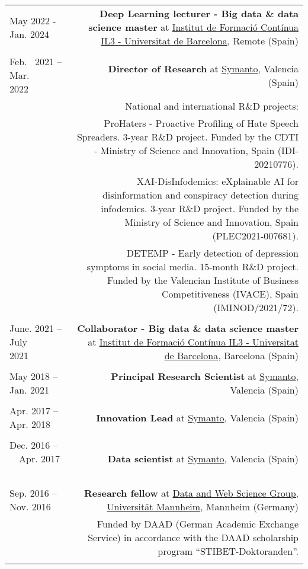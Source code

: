 \documentclass[10pt]{article}
\begin{document}
\begin{tabular}{L!{\VRule}R}
May 2022 - Jan. 2024~~~ &{\textbf{Deep Learning lecturer - Big data \& data science master} at  \href{https://www.il3.ub.edu/}{Institut de Formació Contínua IL3 - Universitat de Barcelona}, Remote (Spain)}\\
&\\

Feb.~ 2021 -- Mar. 2022~~~~ &{\textbf{Director of Research} at \href{https://www.symanto.com/}{Symanto}, Valencia (Spain)}\\
&\scriptsize{National and international R\&D projects:}\\
&\scriptsize{\textcolor{white}{ssss}ProHaters - Proactive Profiling of Hate Speech Spreaders. 3-year R\&D project. Funded by the CDTI - Ministry of Science and Innovation, Spain (IDI-20210776).}\\
&\scriptsize{\textcolor{white}{ssss}XAI-DisInfodemics: eXplainable AI for disinformation and conspiracy detection during infodemics. 3-year R\&D project. Funded by the Ministry of Science and Innovation, Spain (PLEC2021-007681).}\\
&\scriptsize{\textcolor{white}{ssss}DETEMP - Early detection of depression symptoms in social media. 15-month R\&D project. Funded by the Valencian Institute of Business Competitiveness (IVACE), Spain (IMINOD/2021/72)}. \\&\\

June. 2021 -- July 2021~~~~~ &{\textbf{Collaborator - Big data \& data science master} at  \href{https://www.il3.ub.edu/}{Institut de Formació Contínua IL3 - Universitat de Barcelona}, Barcelona (Spain)}\\
&\\
May 2018 -- Jan. 2021~~~ &{\textbf{Principal Research Scientist} at \href{https://www.symanto.com/}{Symanto}, Valencia (Spain)}\\&\\
Apr. 2017 -- Apr. 2018~~~ &{\textbf{Innovation Lead} at \href{https://www.symanto.com/}{Symanto}, Valencia (Spain)}\\&\\
Dec. 2016 -- ~~Apr. 2017 ~~&{\textbf{Data scientist} at \href{https://www.symanto.com/}{Symanto}, Valencia (Spain)}\\&\\
Sep. 2016 -- Nov. 2016 ~~&{\textbf{Research fellow} at \href{http://dws.informatik.uni-mannheim.de/en/home/}{Data and Web Science Group, Universit{\"a}t Mannheim}, Mannheim (Germany)}\\
&\scriptsize{Funded by DAAD (German Academic Exchange Service) in accordance with the DAAD scholarship program ``STIBET-Doktoranden''.}\\&\\


\end{tabular}
\end{document}
